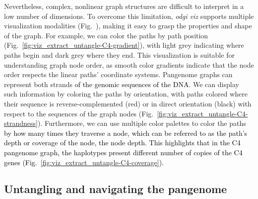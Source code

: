 \documentclass{bioinfo}
\newcommand{\REVIEWED}[1]{{\textcolor{Black}{#1}}}
\begin{document}
Nevertheless, complex, nonlinear graph structures are difficult to interpret in a low number of dimensions.
To overcome this limitation, \textit{odgi viz} supports multiple visualization modalities (Fig.~), making it easy to grasp the properties and shape of the graph.
For example, we can color the paths by path position (Fig.~\ref{fig:viz_extract_untangle-C4-gradient}), with light grey indicating where paths begin and dark grey where they end.
This visualization is suitable for understanding graph node order, as smooth color gradients indicate that the node order respects the linear paths' coordinate systems.
Pangenome graphs can represent both strands \REVIEWED{of the genomic sequences of the DNA}.
We can display such information by coloring the paths by orientation, with paths colored where their sequence is reverse-complemented (red) or in direct orientation (black) with respect to the sequences of the graph nodes (Fig.~\ref{fig:viz_extract_untangle-C4-strandness}).
Furthermore, we can use multiple color palettes to color the paths \REVIEWED{by how many times they traverse a node, which can be referred to as the path's depth or coverage of the node, the node depth.}
\REVIEWED{This highlights that in the C4 pangenome graph, the haplotypes present different number of copies of the C4 genes (Fig.~\ref{fig:viz_extract_untangle-C4-coverage}).}



\subsection{Untangling and navigating the pangenome}
\label{sec:untangle}

\end{document}
